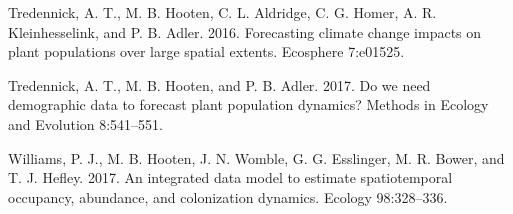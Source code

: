 \documentclass[12pt,]{article}
\begin{document}
\hypertarget{ref-Tredennick2016Ecos}{}
Tredennick, A. T., M. B. Hooten, C. L. Aldridge, C. G. Homer, A. R.
Kleinhesselink, and P. B. Adler. 2016. Forecasting climate change
impacts on plant populations over large spatial extents. Ecosphere
7:e01525.

\hypertarget{ref-Tredennick2017a}{}
Tredennick, A. T., M. B. Hooten, and P. B. Adler. 2017. Do we need
demographic data to forecast plant population dynamics? Methods in
Ecology and Evolution 8:541--551.

\hypertarget{ref-Williams2017a}{}
Williams, P. J., M. B. Hooten, J. N. Womble, G. G. Esslinger, M. R.
Bower, and T. J. Hefley. 2017. An integrated data model to estimate
spatiotemporal occupancy, abundance, and colonization dynamics. Ecology
98:328--336.
\end{document}
